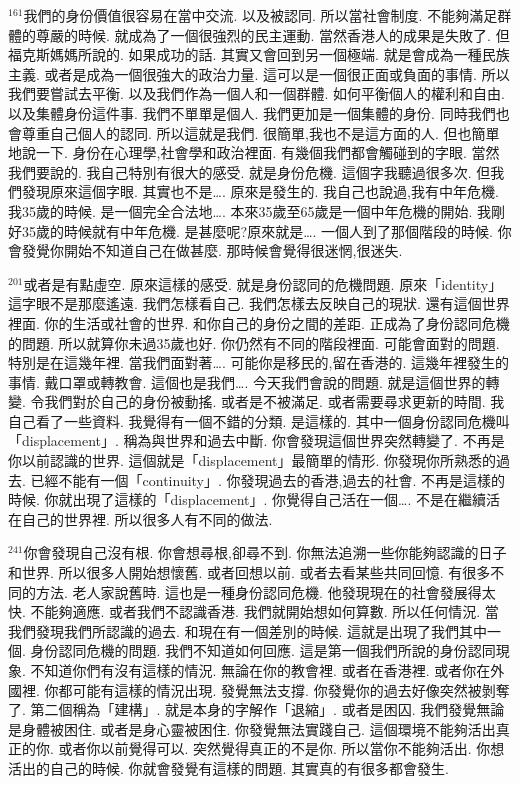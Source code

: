 \documentclass{book}
\begin{document}
$^{161}$我們的身份價值很容易在當中交流.
以及被認同.
所以當社會制度.
不能夠滿足群體的尊嚴的時候.
就成為了一個很強烈的民主運動.
當然香港人的成果是失敗了.
但福克斯媽媽所說的.
如果成功的話.
其實又會回到另一個極端.
就是會成為一種民族主義.
或者是成為一個很強大的政治力量.
這可以是一個很正面或負面的事情.
所以我們要嘗試去平衡.
以及我們作為一個人和一個群體.
如何平衡個人的權利和自由.
以及集體身份這件事.
我們不單單是個人.
我們更加是一個集體的身份.
同時我們也會尊重自己個人的認同.
所以這就是我們.
很簡單,我也不是這方面的人.
但也簡單地說一下.
身份在心理學,社會學和政治裡面.
有幾個我們都會觸碰到的字眼.
當然我們要說的.
我自己特別有很大的感受.
就是身份危機.
這個字我聽過很多次.
但我們發現原來這個字眼.
其實也不是….
原來是發生的.
我自己也說過,我有中年危機.
我35歲的時候.
是一個完全合法地….
本來35歲至65歲是一個中年危機的開始.
我剛好35歲的時候就有中年危機.
是甚麼呢?原來就是….
一個人到了那個階段的時候.
你會發覺你開始不知道自己在做甚麼.
那時候會覺得很迷惘,很迷失.

$^{201}$或者是有點虛空.
原來這樣的感受.
就是身份認同的危機問題.
原來「identity」這字眼不是那麼遙遠.
我們怎樣看自己.
我們怎樣去反映自己的現狀.
還有這個世界裡面.
你的生活或社會的世界.
和你自己的身份之間的差距.
正成為了身份認同危機的問題.
所以就算你未過35歲也好.
你仍然有不同的階段裡面.
可能會面對的問題.
特別是在這幾年裡.
當我們面對著….
可能你是移民的,留在香港的.
這幾年裡發生的事情.
戴口罩或轉教會.
這個也是我們….
今天我們會說的問題.
就是這個世界的轉變.
令我們對於自己的身份被動搖.
或者是不被滿足.
或者需要尋求更新的時間.
我自己看了一些資料.
我覺得有一個不錯的分類.
是這樣的.
其中一個身份認同危機叫「displacement」.
稱為與世界和過去中斷.
你會發現這個世界突然轉變了.
不再是你以前認識的世界.
這個就是「displacement」最簡單的情形.
你發現你所熟悉的過去.
已經不能有一個「continuity」.
你發現過去的香港,過去的社會.
不再是這樣的時候.
你就出現了這樣的「displacement」.
你覺得自己活在一個….
不是在繼續活在自己的世界裡.
所以很多人有不同的做法.

$^{241}$你會發現自己沒有根.
你會想尋根,卻尋不到.
你無法追溯一些你能夠認識的日子和世界.
所以很多人開始想懷舊.
或者回想以前.
或者去看某些共同回憶.
有很多不同的方法.
老人家說舊時.
這也是一種身份認同危機.
他發現現在的社會發展得太快.
不能夠適應.
或者我們不認識香港.
我們就開始想如何算數.
所以任何情況.
當我們發現我們所認識的過去.
和現在有一個差別的時候.
這就是出現了我們其中一個.
身份認同危機的問題.
我們不知道如何回應.
這是第一個我們所說的身份認同現象.
不知道你們有沒有這樣的情況.
無論在你的教會裡.
或者在香港裡.
或者你在外國裡.
你都可能有這樣的情況出現.
發覺無法支撐.
你發覺你的過去好像突然被剝奪了.
第二個稱為「建構」.
就是本身的字解作「退縮」.
或者是困囚.
我們發覺無論是身體被困住.
或者是身心靈被困住.
你發覺無法實踐自己.
這個環境不能夠活出真正的你.
或者你以前覺得可以.
突然覺得真正的不是你.
所以當你不能夠活出.
你想活出的自己的時候.
你就會發覺有這樣的問題.
其實真的有很多都會發生.
\end{document}
